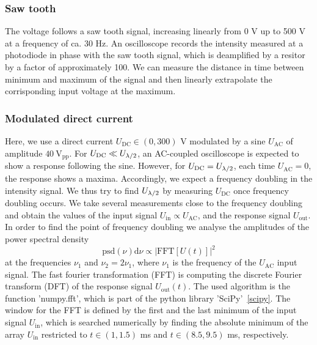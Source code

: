 \subsubsection{Saw tooth}
The voltage follows a saw tooth signal, increasing linearly from 0 V up to 500 V 
at a frequency of ca. 30 Hz. An oscilloscope records the intensity measured 
at a photodiode in phase with the saw tooth signal, which is deamplified 
by a resitor by a factor of approximately 100. 
We can measure the distance in time between minimum and maximum of the signal 
and then linearly extrapolate the corrisponding input voltage at the maximum.
\subsubsection{Modulated direct current}
Here, we use a direct current $U_\mathrm{DC} \in (0, 300)$ V modulated by a 
sine $U_\mathrm{AC}$ of amplitude $40 \ \mathrm{V_{pp}}$. 
For $U_\mathrm{DC} \ll U_{\lambda/2}$, an AC-coupled 
oscilloscope is expected to show a response following the sine. However, for 
$U_\mathrm{DC} = U_{\lambda/2}$, each time $U_\mathrm{AC} = 0$, the response shows a maxima. 
Accordingly, we expect a frequency doubling in the intensity signal. 
We thus try to find $U_{\lambda/2}$ by measuring $U_\mathrm{DC}$ once 
frequency doubling occurs. 
We take several measurements close to the frequency doubling
and obtain the values of the input signal 
$U_\mathrm{in} \propto U_\mathrm{AC}$, 
and the response signal $U_\mathrm{out}$. 
In order to find the point of frequency doubling we analyse 
the amplitudes of the power spectral density 
\begin{equation}
    \mathrm{psd}(\nu) \mathrm{d}\nu \propto |\mathrm{FFT}[U(t)]|^2
\end{equation}
at the frequencies 
$\nu_1$ and $\nu_2 = 2\nu_1$, where $\nu_1$ is the frequency 
of the $U_\mathrm{AC}$ input signal. 
The fast fourier transformation (FFT) is computing the discrete 
Fourier transform (DFT) of the response signal $U_\mathrm{out}(t)$. 
The used algorithm is the function 'numpy.fft',
which is part of the python library 'SciPy'~\ref{scipy}. 
The window for the FFT is defined by the first and the last minimum 
of the input signal $U_\mathrm{in}$, 
which is searched numerically by finding the absolute minimum of the array 
$U_\mathrm{in}$ restricted to $t \in (1, 1.5)$ ms and $t \in (8.5, 9.5)$ ms, 
respectively. 

